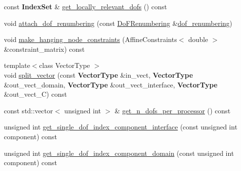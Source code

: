 \begin{DoxyCompactItemize}
\item 
const {\bf Index\+Set} \& \hyperlink{class_do_f_handler_system_a15566db3dbb5d3ab2e4732354432f56e}{get\+\_\+locally\+\_\+relevant\+\_\+dofs} () const 
\item 
void \hyperlink{class_do_f_handler_system_ab31e887efe0c3703e3a777287c250ed0}{attach\+\_\+dof\+\_\+renumbering} (const \hyperlink{class_do_f_renumbering}{Do\+F\+Renumbering} \&\hyperlink{class_do_f_handler_system_aef6159c606a24ac7daadcd3fe082b3b6}{dof\+\_\+renumbering})
\item 
void \hyperlink{class_do_f_handler_system_a8708acd1db19ae6965e885ebbe11d262}{make\+\_\+hanging\+\_\+node\+\_\+constraints} (Affine\+Constraints$<$ double $>$ \&constraint\+\_\+matrix) const 
\item 
{\footnotesize template$<$class Vector\+Type $>$ }\\void \hyperlink{class_do_f_handler_system_abe00061acc73a319e705939ed965018d}{split\+\_\+vector} (const {\bf Vector\+Type} \&in\+\_\+vect, {\bf Vector\+Type} \&out\+\_\+vect\+\_\+domain, {\bf Vector\+Type} \&out\+\_\+vect\+\_\+interface, {\bf Vector\+Type} \&out\+\_\+vect\+\_\+C) const 
\item 
const std\+::vector$<$ unsigned int $>$ \& \hyperlink{class_do_f_handler_system_a741d168ac52d3591d687736a7a4f6dd6}{get\+\_\+n\+\_\+dofs\+\_\+per\+\_\+processor} () const 
\item 
unsigned int \hyperlink{class_do_f_handler_system_a0acf8d35c183ac73bb445e3bac3dd59a}{get\+\_\+single\+\_\+dof\+\_\+index\+\_\+component\+\_\+interface} (const unsigned int component) const 
\item 
unsigned int \hyperlink{class_do_f_handler_system_aa25553114a5cbe59607b8b9df2162c3e}{get\+\_\+single\+\_\+dof\+\_\+index\+\_\+component\+\_\+domain} (const unsigned int component) const 
\end{DoxyCompactItemize}
